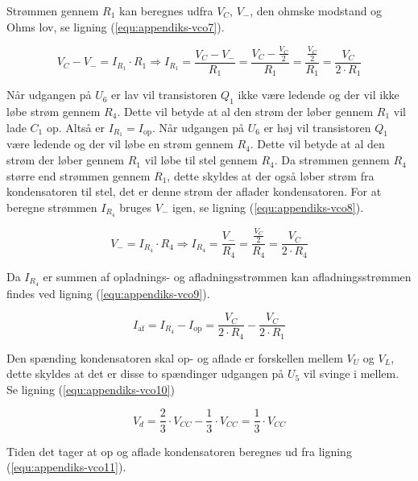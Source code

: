 Strømmen gennem $R_1$ kan beregnes udfra $V_C$, $V_-$, den ohmske modstand og Ohms lov, se ligning (\ref{equ:appendiks-vco7}).

\begin{equation}
\label{equ:appendiks-vco7}
V_C - V_- = I_{R_1} \cdot R_1 \Rightarrow I_{R_1} = \frac{V_C - V_-}{R_1} = \frac{V_C - \frac{V_C}{2}}{R_1} = \frac{\frac{V_C}{2}}{R_1} = \frac{V_C}{2 \cdot R_1}
\end{equation}

Når udgangen på $U_6$ er lav vil transistoren $Q_1$ ikke være ledende og der vil ikke løbe strøm gennem $R_4$. Dette vil betyde at al den strøm der løber gennem $R_1$ vil lade $C_1$ op. Altså er $I_{R_1} = I_{\mathrm{op}}$. Når udgangen på $U_6$ er høj vil transistoren $Q_1$ være ledende og der vil løbe en strøm gennem $R_4$. Dette vil betyde at al den strøm der løber gennem $R_1$ vil løbe til stel gennem $R_4$. Da strømmen gennem $R_4$ større end strømmen gennem $R_1$, dette skyldes at der også løber strøm fra kondensatoren til stel, det er denne strøm der aflader kondensatoren. For at beregne strømmen $I_{R_4}$ bruges $V_-$ igen, se ligning (\ref{equ:appendiks-vco8}).

\begin{equation}
\label{equ:appendiks-vco8}
V_- = I_{R_4} \cdot R_4 \Rightarrow I_{R_4} = \frac{V_-}{R_4} = \frac{\frac{V_C}{2}}{R_4} = \frac{V_C}{2 \cdot R_4}
\end{equation}

Da $I_{R_4}$ er summen af opladnings- og afladningsstrømmen kan afladningsstrømmen findes ved ligning (\ref{equ:appendiks-vco9}).

\begin{equation}
\label{equ:appendiks-vco9}
I_{\mathrm{af}} = I_{R_4} - I_{\mathrm{op}} = \frac{V_C}{2 \cdot R_4} - \frac{V_C}{2 \cdot R_1}
\end{equation}

Den spænding kondensatoren skal op- og aflade er forskellen mellem $V_U$ og $V_L$, dette skyldes at det er disse to spændinger udgangen på $U_5$ vil svinge i mellem. Se ligning (\ref{equ:appendiks-vco10})

\begin{equation}
\label{equ:appendiks-vco10}
V_d = \frac{2}{3} \cdot V_{CC} - \frac{1}{3} \cdot V_{CC} = \frac{1}{3} \cdot V_{CC}
\end{equation}

Tiden det tager at op og aflade kondensatoren beregnes ud fra ligning (\ref{equ:appendiks-vco11}).

